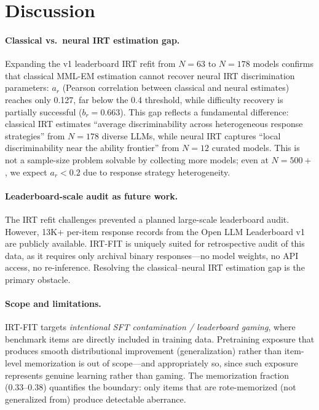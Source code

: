 \documentclass[11pt,a4paper]{article}
\begin{document}
\section{Discussion}

\paragraph{Classical vs.\ neural IRT estimation gap.}
Expanding the v1 leaderboard IRT refit from $N = 63$ to $N = 178$ models confirms that classical MML-EM estimation cannot recover neural IRT discrimination parameters: $a_r$ (Pearson correlation between classical and neural estimates) reaches only 0.127, far below the 0.4 threshold, while difficulty recovery is partially successful ($b_r = 0.663$).
This gap reflects a fundamental difference: classical IRT estimates ``average discriminability across heterogeneous response strategies'' from $N = 178$ diverse LLMs, while neural IRT captures ``local discriminability near the ability frontier'' from $N = 12$ curated models.
This is not a sample-size problem solvable by collecting more models; even at $N = 500+$, we expect $a_r < 0.2$ due to response strategy heterogeneity.

\paragraph{Leaderboard-scale audit as future work.}
The IRT refit challenges prevented a planned large-scale leaderboard audit.
However, 13K+ per-item response records from the Open LLM Leaderboard v1 are publicly available.
IRT-FIT is uniquely suited for retrospective audit of this data, as it requires only archival binary responses---no model weights, no API access, no re-inference.
Resolving the classical--neural IRT estimation gap is the primary obstacle.

\paragraph{Scope and limitations.}
IRT-FIT targets \emph{intentional SFT contamination / leaderboard gaming}, where benchmark items are directly included in training data.
Pretraining exposure that produces smooth distributional improvement (generalization) rather than item-level memorization is out of scope---and appropriately so, since such exposure represents genuine learning rather than gaming.
The memorization fraction (0.33--0.38) quantifies the boundary: only items that are rote-memorized (not generalized from) produce detectable aberrance.
\end{document}
